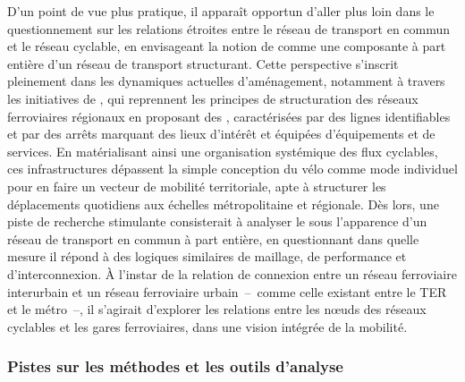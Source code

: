 \begin{refsegment}
D’un point de vue plus pratique, il apparaît opportun d’aller plus loin dans le questionnement sur les relations étroites entre le réseau de transport en commun et le réseau cyclable, en envisageant la notion de  comme une composante à part entière d’un réseau de transport structurant. Cette perspective s’inscrit pleinement dans les dynamiques actuelles d’aménagement, notamment à travers les initiatives de , qui reprennent les principes de structuration des réseaux ferroviaires régionaux en proposant des , caractérisées par des lignes identifiables et par des arrêts marquant des lieux d'intérêt et équipées d'équipements et de services. En matérialisant ainsi une organisation systémique des flux cyclables, ces infrastructures dépassent la simple conception du vélo comme mode individuel pour en faire un vecteur de mobilité territoriale, apte à structurer les déplacements quotidiens aux échelles métropolitaine et régionale. Dès lors, une piste de recherche stimulante consisterait à analyser le  sous l’apparence d’un réseau de transport en commun à part entière, en questionnant dans quelle mesure il répond à des logiques similaires de maillage, de performance et d’interconnexion. À l’instar de la relation de connexion  entre un réseau ferroviaire interurbain et un réseau ferroviaire urbain~–~comme celle existant entre le \acrshort{TER} et le métro~–, il s’agirait d’explorer les relations entre les nœuds des réseaux cyclables et les gares ferroviaires, dans une vision intégrée de la mobilité.%

\subsubsection*{Pistes sur les méthodes et les outils d'analyse
    \label{conclusion-generale:perspectives-pistes-methodes}
    }


\end{refsegment}
